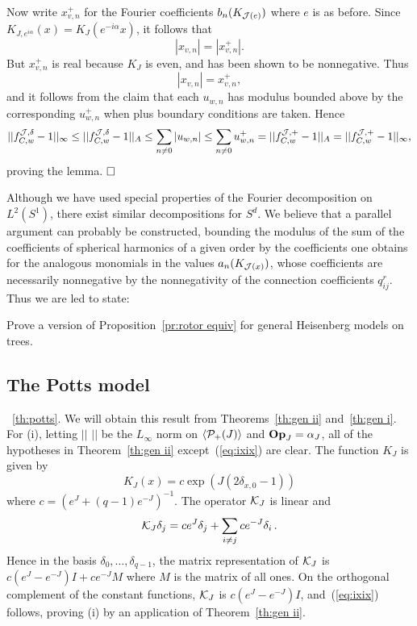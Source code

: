 Now write $x_{v,n}^+$ for the Fourier coefficients $b_n (K_{{\cal J} (e)})$ where
$e$ is as before. 
Since $K_{J , e^{i \alpha}} (x) = K_J (e^{-i \alpha} x)$, it follows that
$$|x_{v,n}| = |x_{v,n}^+| .$$
But $x_{v,n}^+$ is real because $K_J$ is even, and has been 
shown to be nonnegative.  Thus
$$|x_{v,n}| = x_{v,n}^+ ,$$
and it follows from the claim that each $u_{w,n}$ has modulus
bounded above by the corresponding $u_{w,n}^+$ when plus boundary
conditions are taken.  Hence
$$
||f^{{\cal J} , \delta}_{C,w} - 1||_\infty \le ||f^{{\cal J} , \delta}_{C,w} - 1||_A
\leq \sum_{n \neq 0} |u_{w,n}| 
\leq \sum_{n \neq 0} u_{w,n}^+ = ||f^{{\cal J} , +}_{C,w} - 1||_A
= ||f^{{\cal J} , +}_{C,w} - 1||_\infty,$$
proving the lemma.   $\qed$

 Although we have used special properties
of the Fourier decomposition on $L^2 (S^1)$, there exist similar
decompositions for $S^d$.  We believe that a parallel argument
can probably be constructed, bounding the modulus of the sum of 
the coefficients of spherical harmonics of a given order by the
coefficients one obtains for the analogous monomials in the values 
$a_n (K_{{\cal J} (x)})$, whose coefficients are necessarily nonnegative
by the nonnegativity of the connection coefficients $q^r_{ij}$.   
Thus we are led to state:

\begin{pblm} \label{pblm:all spheres}
Prove a version of Proposition~\ref{pr:rotor equiv} for general 
Heisenberg models on trees.
\end{pblm}

\subsection{The Potts model} \label{sub:potts}

~\ref{th:potts}.
We will obtain this result from Theorems~\ref{th:gen ii} and~\ref{th:gen i}.
For (i), letting $||\,\,||$ be the $L_\infty$ norm on $\langle{\cal P}_+(J)\rangle$ and
${\bf Op}_J=\alpha_J$, all of the hypotheses in Theorem~\ref{th:gen ii}
except~(\ref{eq:ixix}) are clear. The function $K_J$ is given by 
$$K_J (x) = c \exp (J (2 \delta_{x,0} - 1))$$
where $c = (e^J + (q-1) e^{-J})^{-1}$.  The operator ${\cal K}_J$ is linear and 
$${\cal K}_J \delta_j = c e^J \delta_j + \sum_{i \neq j} c e^{-J} \delta_i \, .$$
Hence in the basis $\delta_0 , \ldots , \delta_{q-1}$, the
matrix representation of ${\cal K}_J$  is $c (e^J - e^{-J}) I + c e^{-J} M$
where $M$ is the matrix of all ones.  On the orthogonal complement
of the constant functions, ${\cal K}_J$ is $c (e^J - e^{-J}) I$, 
and~(\ref{eq:ixix}) follows, proving (i) by an application of
Theorem~\ref{th:gen ii}.

